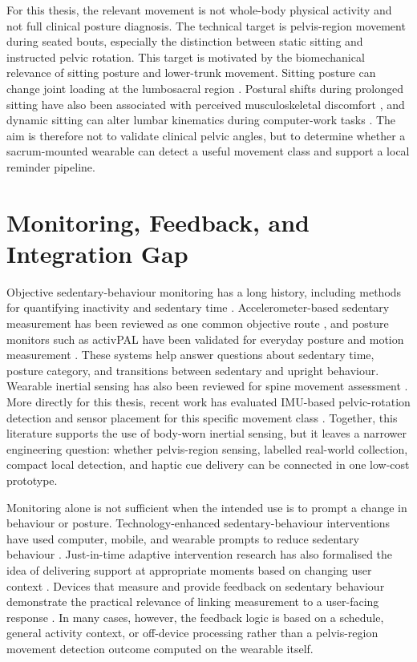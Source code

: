 For this thesis, the relevant movement is not whole-body physical activity and not full clinical posture diagnosis. The technical target is pelvis-region movement during seated bouts, especially the distinction between static sitting and instructed pelvic rotation. This target is motivated by the biomechanical relevance of sitting posture and lower-trunk movement. Sitting posture can change joint loading at the lumbosacral region \cite{kwon2018sitting}. Postural shifts during prolonged sitting have also been associated with perceived musculoskeletal discomfort \cite{waongenngarm2020_postural_shifts_discomfort}, and dynamic sitting can alter lumbar kinematics during computer-work tasks \cite{davidson2024_dynamic_sitting_lumbar}. The aim is therefore not to validate clinical pelvic angles, but to determine whether a sacrum-mounted wearable can detect a useful movement class and support a local reminder pipeline.

\section{Monitoring, Feedback, and Integration Gap}

Objective sedentary-behaviour monitoring has a long history, including methods for quantifying inactivity and sedentary time \cite{chastin2010objective_sedentary}. Accelerometer-based sedentary measurement has been reviewed as one common objective route \cite{byrom2016objective_sedentary_accelerometers}, and posture monitors such as activPAL have been validated for everyday posture and motion measurement \cite{grant2006activpal_validation}. These systems help answer questions about sedentary time, posture category, and transitions between sedentary and upright behaviour. Wearable inertial sensing has also been reviewed for spine movement assessment \cite{papi2017wearable}. More directly for this thesis, recent work has evaluated IMU-based pelvic-rotation detection and sensor placement for this specific movement class \cite{liao2026imu_pelvic_rotation}. Together, this literature supports the use of body-worn inertial sensing, but it leaves a narrower engineering question: whether pelvis-region sensing, labelled real-world collection, compact local detection, and haptic cue delivery can be connected in one low-cost prototype.

Monitoring alone is not sufficient when the intended use is to prompt a change in behaviour or posture. Technology-enhanced sedentary-behaviour interventions have used computer, mobile, and wearable prompts to reduce sedentary behaviour \cite{stephenson2017technology_sedentary_meta}. Just-in-time adaptive intervention research has also formalised the idea of delivering support at appropriate moments based on changing user context \cite{nahumshani2018jitai_design}. Devices that measure and provide feedback on sedentary behaviour demonstrate the practical relevance of linking measurement to a user-facing response \cite{gill2018sitfit_feedback_validation}. In many cases, however, the feedback logic is based on a schedule, general activity context, or off-device processing rather than a pelvis-region movement detection outcome computed on the wearable itself.

